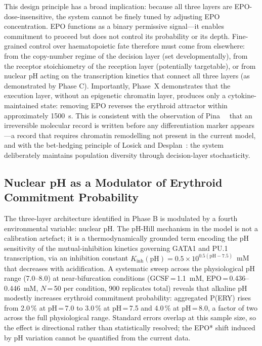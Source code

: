 This design principle has a broad implication: because all three layers are EPO-dose-insensitive, the system cannot be finely tuned by adjusting EPO concentration. EPO functions as a binary permissive signal---it enables commitment to proceed but does not control its probability or its depth. Fine-grained control over haematopoietic fate therefore must come from elsewhere: from the copy-number regime of the decision layer (set developmentally), from the receptor stoichiometry of the reception layer (potentially targetable), or from nuclear pH acting on the transcription kinetics that connect all three layers (as demonstrated by Phase C). Importantly, Phase~X demonstrates that the execution layer, without an epigenetic chromatin layer, produces only a cytokine-maintained state: removing EPO reverses the erythroid attractor within approximately 1500~s. This is consistent with the observation of Pina~\etal~\cite{pina2012} that an irreversible molecular record is written before any differentiation marker appears---a record that requires chromatin remodelling not present in the current model, and with the bet-hedging principle of Losick and Desplan~\cite{losick2008}: the system deliberately maintains population diversity through decision-layer stochasticity.

\subsection{Nuclear pH as a Modulator of Erythroid Commitment Probability}

The three-layer architecture identified in Phase B is modulated by a fourth environmental variable: nuclear pH. The pH-Hill mechanism in the model is not a calibration artefact; it is a thermodynamically grounded term encoding the pH sensitivity of the mutual-inhibition kinetics governing GATA1 and PU.1 transcription, via an inhibition constant $K_\text{inh}(\text{pH}) = 0.5 \times 10^{0.5(\text{pH}-7.5)}$~mM that decreases with acidification. A systematic sweep across the physiological pH range (7.0--8.0) at near-bifurcation conditions (GCSF\,=\,1.1~mM, EPO\,=\,0.436--0.446~mM, $N$\,=\,50 per condition, 900 replicates total) reveals that alkaline pH modestly increases erythroid commitment probability: aggregated P(ERY) rises from 2.0\,\% at pH\,=\,7.0 to 3.0\,\% at pH\,=\,7.5 and 4.0\,\% at pH\,=\,8.0, a factor of two across the full physiological range. Standard errors overlap at this sample size, so the effect is directional rather than statistically resolved; the EPO* shift induced by pH variation cannot be quantified from the current data.

